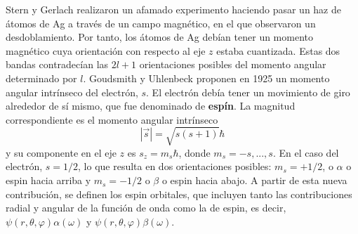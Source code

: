 Stern y Gerlach realizaron un afamado experimento haciendo pasar un 
haz de átomos de Ag a través de un campo magnético, en el que observaron
un desdoblamiento. Por tanto, los átomos de Ag debían tener un momento
magnético cuya orientación con respecto al eje $z$ estaba cuantizada. 
Estas dos bandas contradecían las $2l+1$ orientaciones posibles del
momento angular determinado por $l$. Goudsmith y Uhlenbeck proponen 
en 1925 un momento angular intrínseco del electrón, $s$. El electrón 
debía tener un movimiento de giro alrededor de sí mismo, que fue 
denominado de \textbf{espín}. La magnitud correspondiente es el momento 
angular intrínseco 
\begin{equation}
    |\vec{s}|=\sqrt{s(s+1)}\hbar
\end{equation}
y su componente en el eje $z$ es $s_z=m_s\hbar$, donde $m_s=-s,...,s$.
En el caso del electrón, $s=1/2$, lo que resulta en dos orientaciones
posibles: $m_s=+1/2$, o $\alpha$ o espin hacia arriba y $m_s=-1/2$ o
$\beta$ o espin hacia abajo. A partir de esta nueva contribución,
se definen los espin orbitales, que incluyen tanto las contribuciones
radial y angular de la función de onda como la de espin, es decir,
$\psi(r,\theta,\varphi)\alpha(\omega)$ y 
$\psi(r,\theta,\varphi)\beta(\omega)$.
